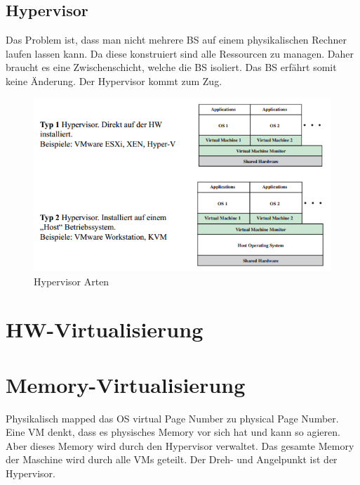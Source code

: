 \subsection{Hypervisor}
Das Problem ist, dass man nicht mehrere BS auf einem physikalischen Rechner laufen lassen kann. Da diese konstruiert sind alle Ressourcen zu managen. Daher braucht es eine Zwischenschicht, welche die BS isoliert. Das BS erfährt somit keine Änderung. Der Hypervisor kommt zum Zug.

\begin{figure}[h!]
\centering
\includegraphics[width=0.8\linewidth]{fig/hypervisor-types}
\caption{Hypervisor Arten}
\label{fig:hypervisor-types}
\end{figure}

\section{HW-Virtualisierung}

\section{Memory-Virtualisierung}
Physikalisch mapped das OS virtual Page Number zu physical Page Number. Eine VM denkt, dass es physisches Memory vor sich hat und kann so agieren. Aber dieses Memory wird durch den Hypervisor verwaltet. Das gesamte Memory der Maschine wird durch alle VMs geteilt. Der Dreh- und Angelpunkt ist der Hypervisor.

